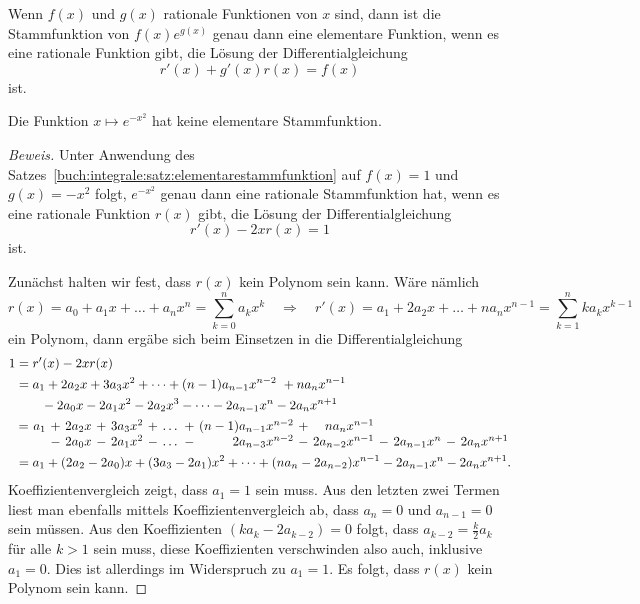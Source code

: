 \begin{satz}
\label{buch:integrale:satz:elementarestammfunktion}
Wenn $f(x)$ und $g(x)$ rationale Funktionen von $x$ sind, dann
ist die Stammfunktion von $f(x)e^{g(x)}$ genau dann eine 
elementare Funktion, wenn es eine rationale Funktion gibt, die
Lösung der Differentialgleichung
\[
r'(x) + g'(x)r(x)=f(x)
\]
ist.
\end{satz}

\begin{satz}
Die Funktion $x\mapsto e^{-x^2}$ hat keine elementare Stammfunktion.
\label{buch:iintegrale:satz:expx2}
\end{satz}

\begin{proof}[Beweis]
Unter Anwendung des Satzes~\ref{buch:integrale:satz:elementarestammfunktion}
auf $f(x)=1$ und $g(x)=-x^2$ folgt, $e^{-x^2}$ genau dann eine rationale 
Stammfunktion hat, wenn es eine rationale Funktion $r(x)$ gibt, die
Lösung der Differentialgleichung
\begin{equation}
r'(x) -2xr(x)=1
\label{buch:integrale:expx2dgl}
\end{equation}
ist.

Zunächst halten wir fest, dass $r(x)$ kein Polynom sein kann.
Wäre nämlich 
\[
r(x)
=
a_0 + a_1x + \dots + a_nx^n
=
\sum_{k=0}^n a_kx^k
\quad\Rightarrow\quad
r'(x)
=
a_1 + 2a_2x + \dots + na_nx^{n-1}
=
\sum_{k=1}^n
ka_kx^{k-1}
\]
ein Polynom, dann ergäbe sich beim Einsetzen in die Differentialgleichung
\begin{align*}
1
&=
r'(x)-2xr(x)
\\
&=
a_1 + 2a_2x + 3a_3x^2 + \dots + (n-1)a_{n-1}x^{n-2} + na_nx^{n-1}
\\
&\qquad
-
2a_0x -2a_1x^2 -2a_2x^3 - \dots - 2a_{n-1}x^n - 2a_nx^{n+1}
\\
&
\hspace{0.7pt}
\renewcommand{\arraycolsep}{1.8pt}
\begin{array}{crcrcrcrcrcrcrcr}
=&a_1&+&2a_2x&+&3a_3x^2&+&\dots&+&(n-1)a_{n-1}x^{n-2}&+&na_{n  }x^{n-1}& &           & & \\
 &   &-&2a_0x&-&2a_1x^2&-&\dots&-&    2a_{n-3}x^{n-2}&-&2a_{n-2}x^{n-1}&-&2a_{n-1}x^n&-&2a_nx^{n+1}
\end{array}
\\
&=
a_1
+
(2a_2-2a_0)x
+
(3a_3-2a_1)x^2
+
\dots
+
(na_n-2a_{n-2})x^{n-1}
-
2a_{n-1}x^n
-
2a_nx^{n+1}.
\end{align*}
Koeffizientenvergleich zeigt, dass $a_1=1$ sein muss.
Aus den letzten zwei Termen liest man ebenfalls mittels Koeffizientenvergleich
ab, dass $a_n=0$ und $a_{n-1}=0$ sein müssen.
Aus den Koeffizienten $(ka_k-2a_{k-2})=0$ folgt, dass
$a_{k-2}=\frac{k}{2}a_k$ für alle $k>1$ sein muss, diese Koeffizienten
verschwinden also auch, inklusive $a_1=0$.
Dies ist allerdings im Widerspruch zu $a_1=1$.
Es folgt, dass $r(x)$ kein Polynom sein kann.


\end{proof}

